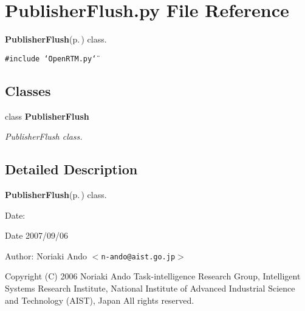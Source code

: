 \section{Publisher\-Flush.py File Reference}
\label{PublisherFlush_8py}
{\bf Publisher\-Flush}{\rm (p.\,\pageref{classPublisherFlush})} class. 

{\tt \#include \char`\"{}Open\-RTM.py\char`\"{}}\par
\subsection*{Classes}
\begin{CompactItemize}
\item 
class {\bf Publisher\-Flush}
\begin{CompactList}\small\item\em Publisher\-Flush class. \item\end{CompactList}\end{CompactItemize}


\subsection{Detailed Description}
{\bf Publisher\-Flush}{\rm (p.\,\pageref{classPublisherFlush})} class. 

\begin{Desc}
\item[Date:]\begin{Desc}
\item[Date]2007/09/06\end{Desc}
\end{Desc}
\begin{Desc}
\item[Author:]Noriaki Ando $<${\tt n-ando@aist.go.jp}$>$\end{Desc}
Copyright (C) 2006 Noriaki Ando Task-intelligence Research Group, Intelligent Systems Research Institute, National Institute of Advanced Industrial Science and Technology (AIST), Japan All rights reserved.